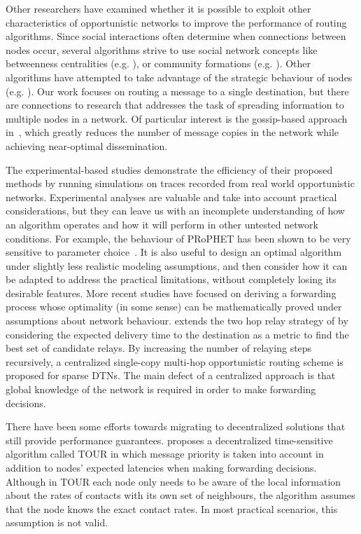 \documentclass[journal,onecolumn,11pt]{IEEEtran}
\theoremstyle{plain}
\theoremstyle{definition}
\begin{document}
Other researchers have examined whether it is possible to exploit
other characteristics of opportunistic networks to improve the
performance of routing algorithms. Since social
interactions often determine when connections between nodes occur,
several algorithms strive to use social network concepts like
betweenness centralities (e.g. \cite{daly2007social}), or community
formations (e.g.
\cite{hui2011bubble,sharma2013contact,xiao2013community}). Other
algorithms have attempted to take advantage of the strategic behaviour
of nodes (e.g. \cite{li2011impact,sermpezis2014understanding}). Our
work focuses on routing a message to a single destination, but there
are connections to research that addresses the task of spreading
information to multiple nodes in a network. Of particular interest is
the gossip-based approach in~\cite{zhang2013gossip}, which greatly reduces the number of
message copies in the network while achieving near-optimal
dissemination.

The experimental-based studies demonstrate the efficiency of their
proposed methods by running simulations on traces recorded from real
world opportunistic networks. Experimental analyses are valuable and
take into account practical considerations, but they can leave us with
an incomplete understanding of how an algorithm operates and how it
will perform in other untested network conditions. For example, the
behaviour of PRoPHET has been shown to be very sensitive to parameter
choice~\cite{grasic2011evolution}. It is also useful to design an
optimal algorithm under slightly less realistic modeling assumptions, and
then consider how it can be adapted to address the practical
limitations, without completely losing its desirable features.
More recent studies have focused on deriving a forwarding process
whose optimality (in some sense) can be mathematically proved under
assumptions about network behaviour.
\cite{conan2008fixed} extends the two hop relay strategy of
\cite{grossglauser2001mobility} by considering the expected delivery
time to the destination as a metric to find the best set of candidate
relays. By increasing the number of relaying steps recursively, a
centralized single-copy multi-hop opportunistic routing scheme is
proposed for sparse DTNs. The main defect of a centralized
approach is that global knowledge of the network is required in
order to make forwarding decisions.

There have been some efforts towards migrating to decentralized
solutions that still provide performance guarantees.
\cite{xiao2013tour} proposes a decentralized time-sensitive algorithm
called TOUR in which message priority is taken into account in
addition to nodes' expected latencies when making forwarding decisions.
Although in TOUR each node only needs to be aware of the local
information about the rates of contacts with its own set of
neighbours, the algorithm assumes that the node knows the exact
contact rates. In most practical scenarios, this assumption is not valid.
\end{document}
